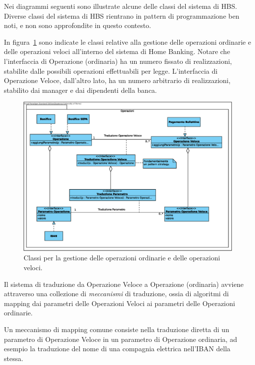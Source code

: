 
Nei diagrammi seguenti sono illustrate alcune delle classi del sistema di HBS.
Diverse classi del sistema di HBS rientrano in pattern di programmazione ben noti, e non sono approfondite in questo contesto.

In figura~\ref{fig:operazioni} sono indicate le classi relative alla gestione delle operazioni ordinarie e delle operazioni veloci all'interno del sistema di Home Banking.
Notare che l'interfaccia di Operazione (ordinaria) ha un numero fissato di realizzazioni, stabilite dalle possibili operazioni effettuabili per legge.
L'interfaccia di Operazione Veloce, dall'altro lato, ha un numero arbitrario di realizzazioni, stabilito dai manager e dai dipendenti della banca.

\begin{figure}[h]
	\centering
	\includegraphics[width=\textwidth]{Images/Operazioni.eps}
	\caption{Classi per la gestione delle operazioni ordinarie e delle operazioni veloci.}
	\label{fig:operazioni}
\end{figure}

Il sistema di traduzione da Operazione Veloce a Operazione (ordinaria) avviene attraverso una collezione di \emph{meccanismi} di traduzione, ossia di algoritmi di mapping dai parametri delle Operazioni Veloci ai parametri delle Operazioni ordinarie.

Un meccanismo di mapping comune consiste nella traduzione diretta di un parametro di Operazione Veloce in un parametro di Operazione ordinaria, ad esempio la traduzione del nome di una compagnia elettrica nell'IBAN della stessa.

